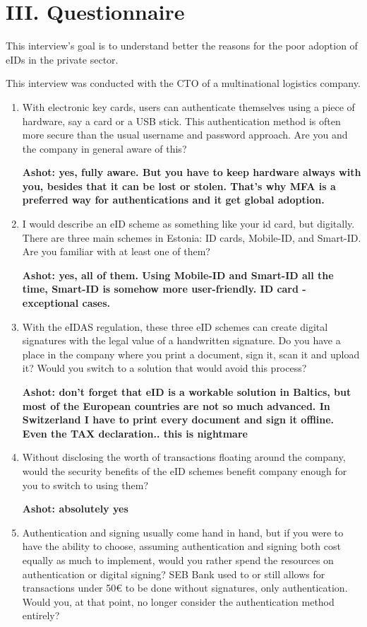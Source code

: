 \section*{III. Questionnaire}

This interview's goal is to understand better the reasons for the poor adoption of eIDs in the private sector.

This interview was conducted with the CTO of a multinational logistics company.

\begin{enumerate}
    \item With electronic key cards, users can authenticate themselves using a piece of hardware, say a card or a USB stick. This authentication method is often more secure than the usual username and password approach. Are you and the company in general aware of this?
    
    \textbf{Ashot: yes, fully aware. But you have to keep hardware always with you, besides that it can be lost or stolen. That's why MFA is a preferred way for authentications and it get global adoption.}
    \item I would describe an eID scheme as something like your id card, but digitally. There are three main schemes in Estonia: ID cards, Mobile-ID, and Smart-ID. Are you familiar with at least one of them?
    
    \textbf{Ashot: yes, all of them. Using Mobile-ID and Smart-ID all the time, Smart-ID is somehow more user-friendly. ID card - exceptional cases.}
    \item With the eIDAS regulation, these three eID schemes can create digital signatures with the legal value of a handwritten signature. Do you have a place in the company where you print a document, sign it, scan it and upload it? Would you switch to a solution that would avoid this process?
    
    \textbf{Ashot: don’t forget that eID is a workable solution in Baltics, but most of the European countries are not so much advanced. In Switzerland I have to print every document and sign it offline. Even the TAX declaration.. this is nightmare}
    \item Without disclosing the worth of transactions floating around the company, would the security benefits of the eID schemes benefit company enough for you to switch to using them?
    
    \textbf{Ashot: absolutely yes}
    \item Authentication and signing usually come hand in hand, but if you were to have the ability to choose, assuming authentication and signing both cost equally as much to implement, would you rather spend the resources on authentication or digital signing? SEB Bank used to or still allows for transactions under 50€ to be done without signatures, only authentication. Would you, at that point, no longer consider the authentication method entirely?
    

\end{enumerate}
